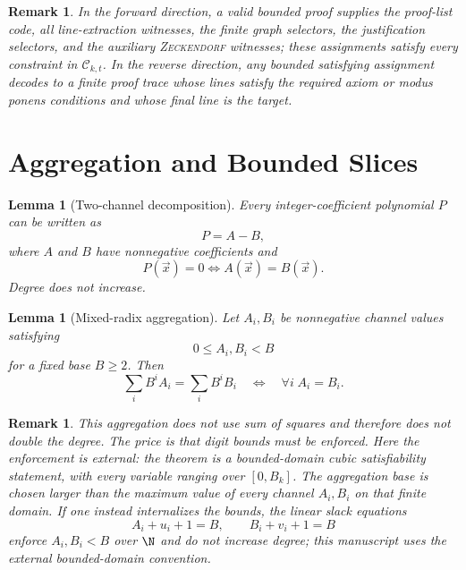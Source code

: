 \documentclass[letterpaper,10pt]{article}
\theoremstyle{upright}
\theoremstyle{upright}
\newtheorem{remark}[theorem]{Remark}
\newtheorem{lemma}[theorem]{Lemma}
\begin{document}
\begin{remark}
	In the forward direction, a valid bounded proof supplies the proof-list code, all line-extraction witnesses, the finite graph selectors, the justification selectors, and the auxiliary \textsc{Zeckendorf} witnesses; these assignments satisfy every constraint in $\mathcal{C}_{k,t}$. In the reverse direction, any bounded satisfying assignment decodes to a finite proof trace whose lines satisfy the required axiom or modus ponens conditions and whose final line is the target.
\end{remark}

\section{Aggregation and Bounded Slices}
\label{sec:aggregation-and-slices}

\begin{lemma}[Two-channel decomposition]
\label{lem:two-channel}
	Every integer-coefficient polynomial $P$ can be written as
	\begin{equation}
		P=A-B,
	\end{equation}
	where $A$ and $B$ have nonnegative coefficients and
	\begin{equation}
		P(\vec{x})=0\iff A(\vec{x})=B(\vec{x}).
	\end{equation}
	Degree does not increase.
\end{lemma}

\begin{lemma}[Mixed-radix aggregation]
\label{lem:no-carry}
	Let $A_i,B_i$ be nonnegative channel values satisfying
	\begin{equation}
		0\leq A_i,B_i<B
	\end{equation}
	for a fixed base $B\geq 2$. Then
	\begin{equation}
		\sum_i B^i A_i=\sum_i B^i B_i
		\quad\Longleftrightarrow\quad
		\forall i\; A_i=B_i.
	\end{equation}
\end{lemma}

\begin{remark}
	This aggregation does not use sum of squares and therefore does not double the degree. The price is that digit bounds must be enforced. Here the enforcement is external: the theorem is a bounded-domain cubic satisfiability statement, with every variable ranging over $[0,B_k]$. The aggregation base is chosen larger than the maximum value of every channel $A_i,B_i$ on that finite domain. If one instead internalizes the bounds, the linear slack equations
	\begin{equation}
		A_i+u_i+1=B,\qquad B_i+v_i+1=B
	\end{equation}
	enforce $A_i,B_i<B$ over $\N$ and do not increase degree; this manuscript uses the external bounded-domain convention.
\end{remark}
\end{document}
